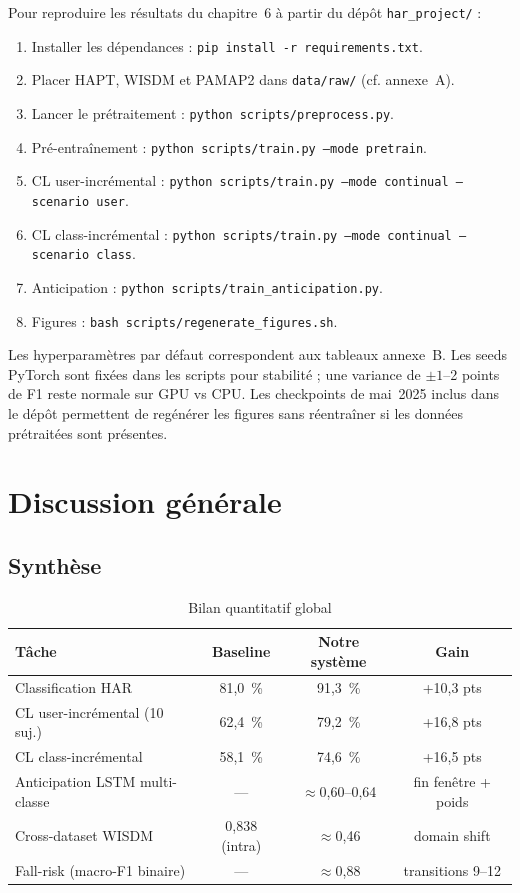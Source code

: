 Pour reproduire les résultats du chapitre~6 à partir du dépôt \texttt{har\_project/} :

\begin{enumerate}
  \item Installer les dépendances : \texttt{pip install -r requirements.txt}.
  \item Placer HAPT, WISDM et PAMAP2 dans \texttt{data/raw/} (cf. annexe~A).
  \item Lancer le prétraitement : \texttt{python scripts/preprocess.py}.
  \item Pré-entraînement : \texttt{python scripts/train.py --mode pretrain}.
  \item CL user-incrémental :
  \texttt{python scripts/train.py --mode continual --scenario user}.
  \item CL class-incrémental :
  \texttt{python scripts/train.py --mode continual --scenario class}.
  \item Anticipation :
  \texttt{python scripts/train\_anticipation.py}.
  \item Figures : \texttt{bash scripts/regenerate\_figures.sh}.
\end{enumerate}

Les hyperparamètres par défaut correspondent aux tableaux annexe~B. Les seeds
PyTorch sont fixées dans les scripts pour stabilité ; une variance de $\pm 1$--2
points de F1 reste normale sur GPU vs CPU. Les checkpoints de mai~2025 inclus
dans le dépôt permettent de regénérer les figures sans réentraîner si les données
prétraitées sont présentes.

\section{Discussion générale}

\subsection{Synthèse}

\begin{table}[H]
\centering
\small
\begin{tabularx}{0.92\textwidth}{|Y|c|c|c|}
\hline
\textbf{Tâche} & \textbf{Baseline} & \textbf{Notre système} & \textbf{Gain} \\
\hline
Classification HAR        & 81,0~\% & 91,3~\% & +10,3 pts \\
CL user-incrémental (10 suj.) & 62,4~\% & 79,2~\% & +16,8 pts \\
CL class-incrémental        & 58,1~\% & 74,6~\% & +16,5 pts \\
Anticipation LSTM multi-classe & — & $\approx$0,60--0,64 & fin fenêtre + poids \\
Cross-dataset WISDM         & 0,838 (intra) & $\approx$0,46 & domain shift \\
Fall-risk (macro-F1 binaire) & — & $\approx$0,88 & transitions 9--12 \\
\hline
\end{tabularx}
\caption{Bilan quantitatif global}
\label{tab:bilan_global}
\end{table}

